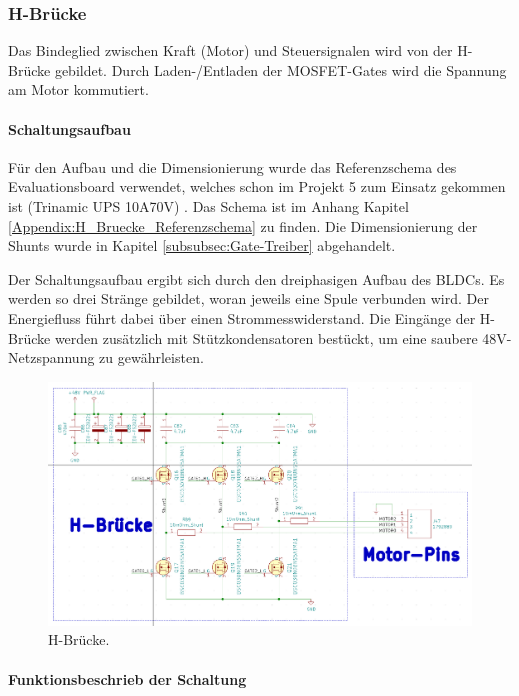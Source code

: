\subsubsection{H-Brücke}
\label{subsubsec:H-Brücke}

Das Bindeglied zwischen Kraft (Motor) und Steuersignalen wird von der H-Brücke gebildet. Durch Laden-/Entladen der MOSFET-Gates wird die Spannung am Motor kommutiert.

\paragraph{Schaltungsaufbau}\mbox{}

Für den Aufbau und die Dimensionierung wurde das Referenzschema des Evaluationsboard verwendet, welches schon im Projekt 5 zum Einsatz gekommen ist (Trinamic UPS 10A70V) \cite{trinamicmotion_control_gmbh__co_kg_tmc-ups-xaxv-eval_2017}.  Das Schema ist im Anhang Kapitel \ref{Appendix:H_Bruecke_Referenzschema} zu finden. Die Dimensionierung der Shunts wurde in Kapitel \ref{subsubsec:Gate-Treiber} abgehandelt.

Der Schaltungsaufbau ergibt sich durch den dreiphasigen Aufbau des BLDCs. Es werden so drei Stränge gebildet, woran jeweils eine Spule verbunden wird. Der Energiefluss führt dabei über einen Strommesswiderstand. Die Eingänge der H-Brücke werden zusätzlich mit Stützkondensatoren bestückt, um eine saubere 48V-Netzspannung zu gewährleisten.

\begin{figure}[H]
	\centering
	\includegraphics[width=\textwidth]{graphics/Schema_H_Bruecke_und_BLDC}
	\caption{H-Brücke.}
	\label{fig:Schema_H_Bruecke_und_BLDC}
\end{figure}

\paragraph{Funktionsbeschrieb der Schaltung}\mbox{}

